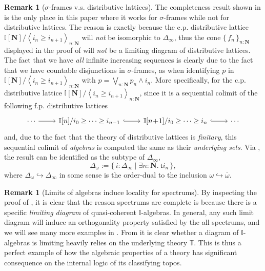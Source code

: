 \documentclass[12pt]{amsart}
\theoremstyle{definition}
\newtheorem{remark}[theorem]{Remark}
\newcommand{\mb}[1]{\mathbf{#1}}
\newcommand{\mbb}[1]{\mathbb{#1}}
\newcommand{\T}{\mbb T}
\newcommand{\I}{\mbb I}
\newcommand{\ms}[1]{\mathsf{#1}}
\newcommand{\ov}[1]{\overline{#1}}
\newcommand{\set}[1]{\{\,#1\,\}}
\newcommand{\pair}[1]{\left\langle#1\right\rangle}
\newcommand{\scomp}[2]{\{\,#1\mid#2\,\}}
\newcommand{\hook}{\hookrightarrow}
\newcommand{\N}{\mb N}
\newcommand{\ex}[2]{\exists #1\!\colon\!\!#2.\ }
\begin{document}
\begin{remark}[$\sigma$-frames v.s. distributive lattices]\label{rem:whynotdis}
  The completeness result shown in  is the only place in this paper where it works for $\sigma$-frames while not for distributive lattices. The reason is exactly because the c.p. distributive lattice $\I[\N]/\pair{i_n \ge i_{n+1}}_{n:\N}$ will \emph{not} be isomorphic to $\Delta_\infty$, thus the cone $\set{f_n}_{n:\N}$ displayed in the proof of  will \emph{not} be a limiting diagram of distributive lattices. The fact that we have \emph{all} infinite increasing sequences is clearly due to the fact that we have countable disjunctions in $\sigma$-frames, as when identifying $p$ in $\I[\N]/\pair{i_n \ge i_{n+1}}_{n:\N}$ with $p = \bigvee_{n:\N}p_n\wedge i_n$. More specifically, for the c.p. distributive lattice $\I[\N]/\pair{i_n \ge i_{n+1}}_{n:\N}$, since it is a sequential colimit of the following f.p. distributive lattices
  \[ 
  \begin{tikzcd}
    \cdots \ar[r] & \I[n]/i_{0} \ge \cdots \ge i_{n-1} \ar[r, hook] & \I[n\!+\!1]/i_0 \ge \cdots \ge i_n \ar[r, hook] & \cdots
  \end{tikzcd}
  \]
  and, due to the fact that the theory of distributive lattices is \emph{finitary}, this sequential colimit of \emph{algebras} is computed the same as their \emph{underlying sets}. Via , the result can be identified as the subtype of $\Delta_\infty$,
  \[ \Delta_\omega := \scomp{i : \Delta_\infty}{\ex n\N \ms ti_n}, \]
  where $\Delta_\omega \hook \Delta_\infty$ in some sense is the order-dual to the inclusion $\omega\hook\ov\omega$.
\end{remark}

\begin{remark}[Limits of algebras induce locality for spectrums]\label{rem:limofalgloc}
  By inspecting the proof of , it is clear that the reason spectrums are complete is because there is a specific \emph{limiting diagram} of quasi-coherent $\I$-algebras. In general, any such limit diagram will induce an orthogonality property satisfied by the all spectrums, and we will see many more examples in . From  it is clear whether a diagram of $\I$-algebras is limiting heavily relies on the underlying theory $\T$. This is thus a perfect example of how the algebraic properties of a theory has significant consequence on the internal logic of its classifying topos.
\end{remark}
\end{document}
